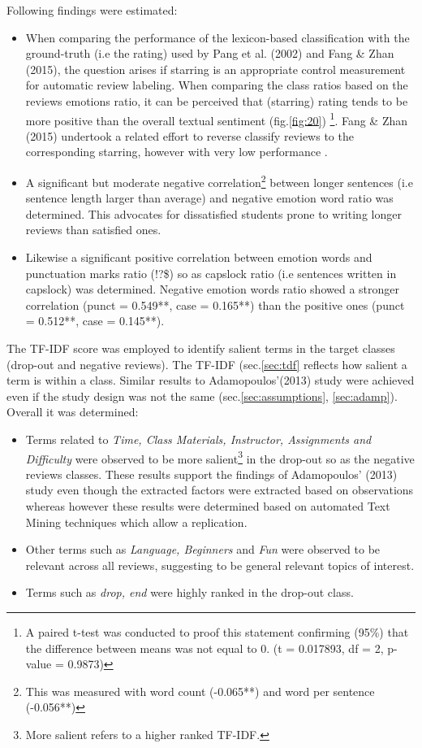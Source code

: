 \documentclass[
	a4paper,
	pdftex,
	12pt,	
	footinclude=true,
	fleqn,
	final,
	]{report}%
\begin{document}
Following findings were estimated:
\begin{itemize}
\item When comparing the performance of the lexicon-based classification
with the ground-truth (i.e the rating) used by Pang et al. (2002)
and Fang \& Zhan (2015), the question arises if starring is 
an appropriate control measurement for automatic review labeling. 
When comparing the class ratios based on the reviews emotions ratio, 
it can be perceived that (starring) rating tends to be more positive 
than the overall textual sentiment (fig.\ref{fig:20}) \footnote{
A paired t-test was conducted to proof this statement confirming (95\%)
that the difference between means was not equal to 0.
(t = 0.017893, df = 2, p-value = 0.9873)}. 
Fang \& Zhan (2015) undertook a related effort to reverse classify 
reviews to the corresponding starring, however with very low 
performance \cite{Fang2015}.
 \item A significant but moderate negative correlation\footnote{
 This was measured with word count (-0.065**) and word per sentence (-0.056**)} 
 between longer sentences (i.e sentence length larger than average) and  
 negative emotion word ratio was determined. This advocates for dissatisfied students
 prone to writing longer reviews than satisfied ones.
 \item Likewise a significant positive correlation 
 between emotion words and punctuation marks ratio (!?\$) so 
 as capslock ratio (i.e sentences written in capslock) was determined.
 Negative emotion words ratio showed a stronger correlation 
 (punct = 0.549**, case = 0.165**) than the positive ones 
 (punct = 0.512**, case = 0.145**).
\end{itemize}

The TF-IDF score was employed to identify salient 
terms in the target classes (drop-out and negative reviews).
The TF-IDF (sec.\ref{sec:tdf} reflects how salient a term is 
within a class. Similar results to Adamopoulos'(2013) study 
were achieved even if the study design was not the 
same (sec.\ref{sec:assumptions}, 
\ref{sec:adamp}). Overall it was determined:

\begin{itemize}
\item Terms related to \emph{Time, Class Materials, Instructor, 
Assignments and Difficulty}\cite{Adamopoulos2013} were observed
to be more salient\footnote{More salient refers to a higher ranked TF-IDF.} 
in the drop-out so as the negative reviews classes. These results support 
the findings of Adamopoulos' (2013) study even though 
the extracted factors were extracted based on observations whereas
however these results were determined based on automated 
Text Mining techniques which allow a replication.

\item Other terms such as \emph{Language, Beginners}
and \emph{Fun} were observed to be relevant across all reviews, suggesting
to be general relevant topics of interest.
\item Terms such as \emph{drop, end} were highly ranked in the drop-out class.
\end{itemize}
 
\end{document}
